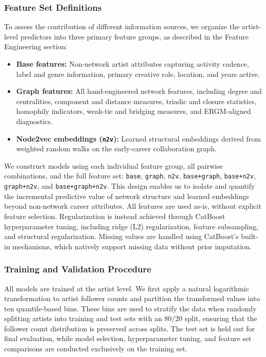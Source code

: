 \documentclass[fleqn,10pt]{wlscirep}
\begin{document}
\subsubsection*{Feature Set Definitions}

To assess the contribution of different information sources, we organize the artist-level predictors into three primary feature groups, as described in the Feature Engineering section:

\begin{itemize}
    \item \textbf{Base features:} Non-network artist attributes capturing activity cadence, label and genre information, primary creative role, location, and years active.
    \item \textbf{Graph features:} All hand-engineered network features, including degree and centralities, component and distance measures, triadic and closure statistics, homophily indicators, weak-tie and bridging measures, and ERGM-aligned diagnostics.
    \item \textbf{Node2vec embeddings (\texttt{n2v}):} Learned structural embeddings derived from weighted random walks on the early-career collaboration graph.
\end{itemize}

We construct models using each individual feature group, all pairwise combinations, and the full feature set: \texttt{base}, \texttt{graph}, \texttt{n2v}, \texttt{base+graph}, \texttt{base+n2v}, \texttt{graph+n2v}, and \texttt{base+graph+n2v}. This design enables us to isolate and quantify the incremental predictive value of network structure and learned embeddings beyond non-network career attributes. All features are used as-is, without explicit feature selection. Regularization is instead achieved through CatBoost hyperparameter tuning, including ridge (L2) regularization, feature subsampling, and structural regularization. Missing values are handled using CatBoost’s built-in mechanisms, which natively support missing data without prior imputation.

\subsubsection*{Training and Validation Procedure}

All models are trained at the artist level. We first apply a natural logarithmic transformation to artist follower counts and partition the transformed values into ten quantile-based bins. These bins are used to stratify the data when randomly splitting artists into training and test sets with an 80/20 split, ensuring that the follower count distribution is preserved across splits. The test set is held out for final evaluation, while model selection, hyperparameter tuning, and feature set comparisons are conducted exclusively on the training set.
\end{document}

